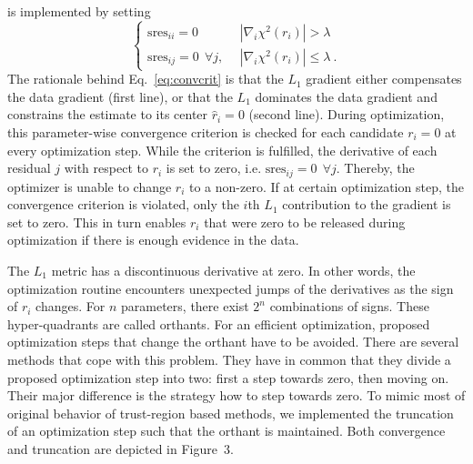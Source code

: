 \documentclass{bioinfo}
\begin{document}
is implemented by setting
\begin{equation}
	\begin{cases}
	\text{sres}_{ii}=0&|\nabla_i \chi^2(r_i)| > \lambda\\
	\text{sres}_{ij}=0\:\:\forall j, \:\:&|\nabla_i \chi^2(r_i)| \le \lambda \:.
	\end{cases}
	\label{eq:sresset}
\end{equation}
The rationale behind Eq.~\ref{eq:convcrit} is that the $L_1$ gradient either compensates the data gradient (first line), or that the $L_1$ dominates the data gradient and constrains the estimate to its center $\hat r_i=0$ (second line).
During optimization, this parameter-wise convergence criterion is checked for each candidate $r_i=0$ at every optimization step.
While the criterion is fulfilled, the derivative of each residual $j$ with respect to $r_i$ is set to zero, i.e. $\text{sres}_{ij}=0\:\:\forall j$.
Thereby, the optimizer is unable to change $r_i$ to a non-zero.
If at certain optimization step, the convergence criterion is violated, only the $i$th $L_1$ contribution to the gradient is set to zero.
This in turn enables $r_i$ that were zero to be released during optimization if there is enough evidence in the data.

The $L_1$ metric has a discontinuous derivative at zero.
In other words, the optimization routine encounters unexpected jumps of the derivatives as the sign of $r_i$ changes.
For $n$ parameters, there exist $2^n$ combinations of signs.
These hyper-quadrants are called orthants.
For an efficient optimization, proposed optimization steps that change the orthant have to be avoided.
There are several methods that cope with this problem.
They have in common that they divide a proposed optimization step into two:
first a step towards zero, then moving on.
Their major difference is the strategy how to step towards zero.
To mimic most of original behavior of trust-region based methods, we implemented the truncation of an optimization step such that the orthant is maintained.
Both convergence and truncation are depicted in Figure~3\vphantom{\ref{fig:03}}.
\end{document}

